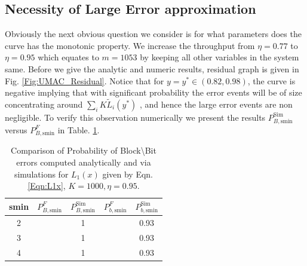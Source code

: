 \subsection{Necessity of Large Error approximation}
Obviously the next obvious question we consider is for what parameters does the curve has the monotonic property. We increase the throughput from $\eta=0.77$ to $\eta=0.95$ which equates to $m=1053$ by keeping all other variables in the system same. Before we give the analytic and numeric results, residual graph is given in Fig. \ref{Fig:UMAC_Residual}. Notice that for $y=y^*\in(0.82,0.98)$, the curve is negative implying that with significant probability the error events will be of size concentrating around $\sum_{i}K\tilde{L}_{i}(y^*)$ , and hence the large error events are non negligible. To verify this observation numerically we present the results  $P_{B,\text{smin}}^{\text{Sim}}$ versus $P_{B,\text{smin}}^F$ in Table. \ref{Table:SimvsAnalytic3}.
%

\begin{table}
\centering
\begin{tabular}{c c c c c}
\hline  \hline
smin & $P_{B,\text{smin}}^F$ & $P_{B,\text{smin}}^{\text{Sim}}$& $P_{b,\text{smin}}^{F}$ &$P_{b,\text{smin}}^{\text{Sim}}$\\
\hline
2 &   &1 & &0.93\\
3 &  &1 & &0.93\\
4 &  &1 & &0.93\\
\end{tabular}
\caption{Comparison of Probability of Block\textbackslash Bit errors computed analytically and via simulations for $L_1(x)$ given by Eqn. \eqref{Eqn:L1x}, $K=1000, \eta=0.95$.}
\label{Table:SimvsAnalytic3}
\end{table}